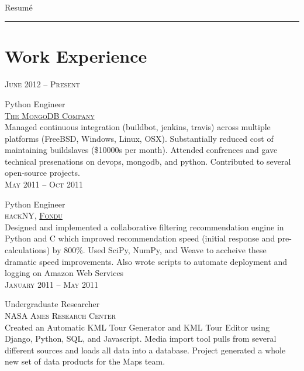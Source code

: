 \documentclass[10pt]{article}
\begin{document}
\color{text1} %
     \par{\\
      \color{headings} Resumé \par
      {\color{white} \hrule}} %

\begin{minipage}[t]{0.5\textwidth}

\vspace{0pt}   %

\section{Work Experience}

   \raggedleft
   \textsc{\normalsize June 2012 -- Present}\par
   \raggedright\large Python Engineer\\
   \textsc{\href{http://mongodb.org/}{The MongoDB Company}}\\
   \normalsize{Managed continuous integration (buildbot, jenkins, travis)
   across multiple platforms (FreeBSD, Windows, Linux, OSX). Substantially
   reduced cost of maintaining buildslaves (\$10000s per month). Attended
   confrences and gave technical presenations on devops, mongodb, and
   python. Contributed to several open-source projects.}\\[5pt]
   \raggedleft
   \textsc{\normalsize May 2011 -- Oct 2011}\par
   \raggedright\large Python Engineer\\
   \textsc{hackNY, \href{http://fondu.com/}{Fondu}}\\
   \normalsize{Designed and implemented a collaborative filtering
   recommendation engine in Python and C which improved recommendation
   speed (initial response and pre-calculations) by 800\%. Used SciPy,
   NumPy, and Weave to accheive these dramatic speed improvements. Also
   wrote scripts to automate deployment and logging on Amazon Web Services
   }\\[5pt]

   \raggedleft
   \textsc{\normalsize January 2011 -- May 2011}\par
   \raggedright\large Undergraduate Researcher\\
   \textsc{NASA Ames Research Center}\\
   \normalsize{Created an Automatic KML Tour Generator and KML Tour
   Editor using Django, Python, SQL, and Javascript. Media import tool
   pulls from several different sources and loads all data into a
   database. Project generated a whole new set of data products for
   the Maps team.}\\[5pt]


\end{minipage}
\end{document}
